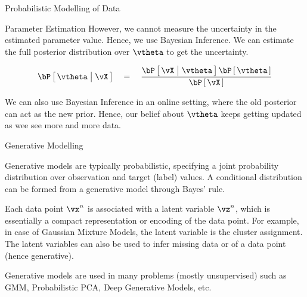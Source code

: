 \documentclass{article}
\begin{document}
\begin{ssection}{Probabilistic Modelling of Data}
\begin{ssubsection}{Parameter Estimation}
		However, we cannot measure the uncertainty in the estimated parameter value. Hence, we use Bayesian Inference. We can estimate the full posterior distribution over $\vtheta$ to get the uncertainty.

		\begin{align*}
			\prob{\vtheta \pipe \vX}	\eq	\frac{\prob{\vX \pipe \vtheta} \prob{\vtheta}}{\prob{\vX}}
		\end{align*}

		We can also use Bayesian Inference in an online setting, where the old posterior can act as the new prior. Hence, our belief about $\vtheta$ keeps getting updated as wee see more and more data.

	\end{ssubsection}

\end{ssection}

\begin{ssection}{Generative Modelling}

	Generative models are typically probabilistic, specifying a joint probability distribution over observation and target (label) values. A conditional distribution can be formed from a generative model through Bayes' rule. \br

	Each data point $\vx^n$ is associated with a latent variable $\vz^n$, which is essentially a compact representation or encoding of the data point. For example, in case of Gaussian Mixture Models, the latent variable is the cluster assignment. The latent variables can also be used to infer missing data or  of a data point (hence generative). \br

	Generative models are used in many problems (mostly unsupervised) such as GMM, Probabilistic PCA, Deep Generative Models, etc.
	
\end{ssection}
\end{document}
